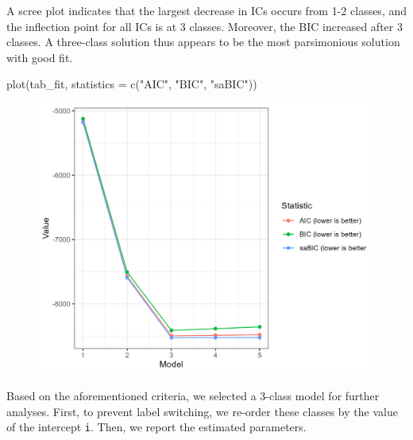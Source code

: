 \documentclass[
  man,floatsintext]{apa6}
\newenvironment{Shaded}{\begin{snugshade}}{\end{snugshade}}
\newcommand{\AttributeTok}[1]{\textcolor[rgb]{0.77,0.63,0.00}{#1}}
\newcommand{\CommentTok}[1]{\textcolor[rgb]{0.56,0.35,0.01}{\textit{#1}}}
\newcommand{\ConstantTok}[1]{\textcolor[rgb]{0.00,0.00,0.00}{#1}}
\newcommand{\DecValTok}[1]{\textcolor[rgb]{0.00,0.00,0.81}{#1}}
\newcommand{\FunctionTok}[1]{\textcolor[rgb]{0.00,0.00,0.00}{#1}}
\newcommand{\NormalTok}[1]{#1}
\newcommand{\OtherTok}[1]{\textcolor[rgb]{0.56,0.35,0.01}{#1}}
\newcommand{\SpecialCharTok}[1]{\textcolor[rgb]{0.00,0.00,0.00}{#1}}
\newcommand{\StringTok}[1]{\textcolor[rgb]{0.31,0.60,0.02}{#1}}
\begin{document}
A scree plot indicates that
the largest decrease in ICs occurs from 1-2 classes,
and the inflection point for all ICs is at 3 classes.
Moreover, the BIC increased after 3 classes.
A three-class solution thus appears to be the most parsimonious
solution with good fit.

\begin{Shaded}
\begin{Highlighting}[]
\FunctionTok{plot}\NormalTok{(tab\_fit, }\AttributeTok{statistics =} \FunctionTok{c}\NormalTok{(}\StringTok{"AIC"}\NormalTok{, }\StringTok{"BIC"}\NormalTok{, }\StringTok{"saBIC"}\NormalTok{))}
\end{Highlighting}
\end{Shaded}

\begin{figure}
\includegraphics[width=0.5\linewidth]{appendices/lcga_plot_fit} \caption{ }\label{fig:unnamed-chunk-15}
\end{figure}

Based on the aforementioned criteria,
we selected a 3-class model for further analyses.
First, to prevent label switching,
we re-order these classes by the value of the intercept \texttt{i}.
Then, we report the estimated parameters.

\begin{Shaded}
\end{Shaded}
\end{document}
